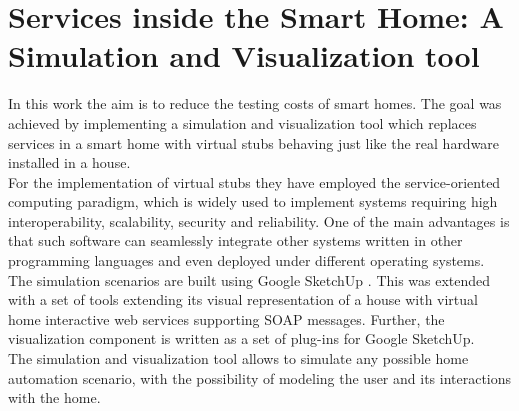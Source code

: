 \section{Services inside the Smart Home: A Simulation and Visualization tool}\label{sec:services_in_smart_homes}

In this work \cite{lazovik2009services} the aim is to reduce the testing costs of smart homes. The goal was achieved by implementing a simulation and visualization tool which replaces services in a smart home with virtual stubs behaving just like the real hardware installed in a house.\\

For the implementation of virtual stubs they have employed the service-oriented computing paradigm, which is widely used to implement systems requiring high interoperability, scalability, security and reliability. One of the main advantages is that such software can seamlessly integrate other systems written in other programming languages and even deployed under different operating systems.\\

The simulation scenarios are built using Google SketchUp \cite{sketchup:online}. This was extended with a set of tools extending its visual representation of a house with virtual home interactive web services supporting SOAP messages. Further, the visualization component is written as a set of plug-ins for Google SketchUp.\\

The simulation and visualization tool allows to simulate any possible home automation scenario, with the possibility of modeling the user and its interactions with the home.
